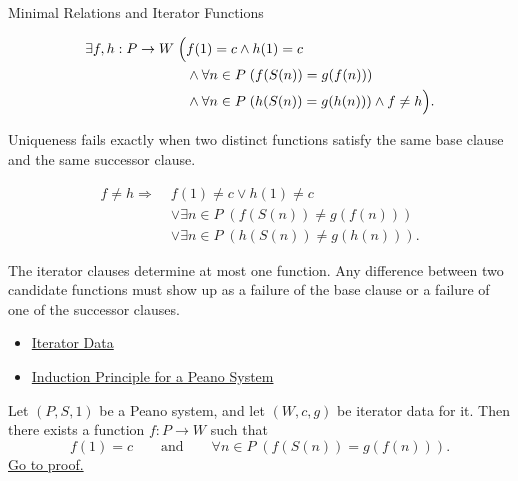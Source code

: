 \begin{topicbox}{Minimal Relations and Iterator Functions}
\begin{remark*}
\[
\begin{aligned}
\exists f,h:P\to W\;\Bigl(&
f(1)=c\land h(1)=c\\
&\land \forall n\in P\;(f(S(n))=g(f(n)))\\
&\land \forall n\in P\;(h(S(n))=g(h(n)))
\land f\neq h\Bigr).
\end{aligned}
\]
\end{remark*}

\begin{remark*}
Uniqueness fails exactly when two distinct functions satisfy the same base
clause and the same successor clause.
\end{remark*}

\begin{remark*}
\[
\begin{aligned}
f\neq h
\Longrightarrow\;&
f(1)\neq c\lor h(1)\neq c\\
&\lor \exists n\in P\;(f(S(n))\neq g(f(n)))\\
&\lor \exists n\in P\;(h(S(n))\neq g(h(n))).
\end{aligned}
\]
\end{remark*}

\begin{remark*}[Interpretation]
The iterator clauses determine at most one function. Any difference between
two candidate functions must show up as a failure of the base clause or a
failure of one of the successor clauses.
\end{remark*}

\begin{remark*}[Dependencies]
\begin{itemize}
  \item \hyperref[def:iterator-data-on-peano-system]{Iterator Data}
  \item \hyperref[thm:induction-principle-for-peano-system]{Induction Principle for a Peano System}
\end{itemize}
\end{remark*}

\begin{tcolorbox}[colback=lembox, colframe=lemborder, arc=2pt,
  left=6pt, right=6pt, top=4pt, bottom=4pt,
  title={\small\textbf{Lemma (Existence of an Iterator Function)}},
  fonttitle=\small\bfseries]
\begin{lemma}
\label{lem:existence-of-iterator-function}
Let $(P,S,1)$ be a Peano system, and let $(W,c,g)$ be iterator data for it.
Then there exists a function $f:P\to W$ such that
\[
f(1)=c
\qquad\text{and}\qquad
\forall n\in P\;(f(S(n))=g(f(n))).
\]
\hyperref[prf:existence-of-iterator-function]{Go to proof.}
\end{lemma}
\end{tcolorbox}


\end{topicbox}
